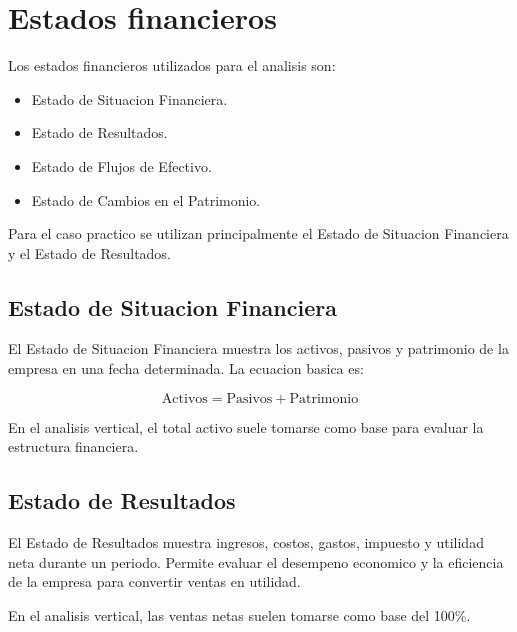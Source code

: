 \section{Estados financieros}

Los estados financieros utilizados para el analisis son:

\begin{itemize}
  \item Estado de Situacion Financiera.
  \item Estado de Resultados.
  \item Estado de Flujos de Efectivo.
  \item Estado de Cambios en el Patrimonio.
\end{itemize}

Para el caso practico se utilizan principalmente el Estado de Situacion Financiera y el Estado de Resultados.

\subsection{Estado de Situacion Financiera}

El Estado de Situacion Financiera muestra los activos, pasivos y patrimonio de la empresa en una fecha determinada. La ecuacion basica es:

\[
\text{Activos} = \text{Pasivos} + \text{Patrimonio}
\]

En el analisis vertical, el total activo suele tomarse como base para evaluar la estructura financiera.

\subsection{Estado de Resultados}

El Estado de Resultados muestra ingresos, costos, gastos, impuesto y utilidad neta durante un periodo. Permite evaluar el desempeno economico y la eficiencia de la empresa para convertir ventas en utilidad.

En el analisis vertical, las ventas netas suelen tomarse como base del 100\%.

